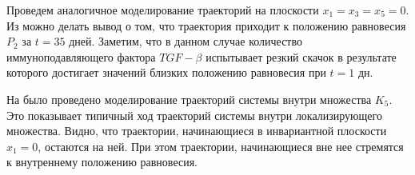 \documentclass[14pt,a4paper]{extarticle}
\begin{document}
\begin{example}
		Проведем аналогичное моделирование траекторий на плоскости $x_1=x_3=x_5=0$. Из  можно делать вывод о том, что траектория приходит к положению равновесия $P_2$ за $t=35$ дней. Заметим, что в данном случае количество иммуноподавляющего фактора $TGF-\beta$ испытывает резкий скачок в результате которого достигает значений близких положению равновесия при $t=1$ дн. 	
		
		На  было проведено моделирование траекторий системы внутри множества $K_5$. Это показывает типичный ход траекторий системы внутри локализирующего множества. Видно, что траектории, начинающиеся в инвариантной плоскости $x_1=0$, остаются на ней. При этом траектории, начинающиеся вне нее стремятся к внутреннему положению равновесия.
	\end{example}
	
\end{document}
